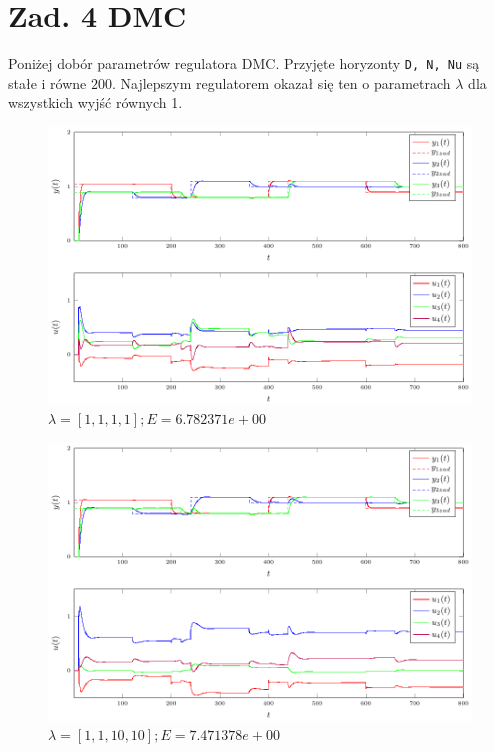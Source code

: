\documentclass[a4paper,titlepage,11pt,twosides,floatssmall]{mwrep}
\begin{document}
\chapter*{Zad. 4 DMC}

Poniżej dobór parametrów regulatora DMC. Przyjęte horyzonty \verb=D, N, Nu= są stałe i równe $200$. Najlepszym regulatorem okazał się ten o parametrach $\lambda$ dla wszystkich wyjść równych 1.


\begin{figure}[H]
	\centering
	\includegraphics[scale=1]{../wykresy/zad4_dmc_1.pdf}
	\caption{$\lambda = [1, 1, 1, 1]; E = 6.782371e+00$}
\end{figure}


\begin{figure}[H]
	\centering
	\includegraphics[scale=1]{../wykresy/zad4_dmc_2.pdf}
	\caption{$\lambda = [1, 1, 10, 10]; E = 7.471378e+00$}
\end{figure}
\end{document}
